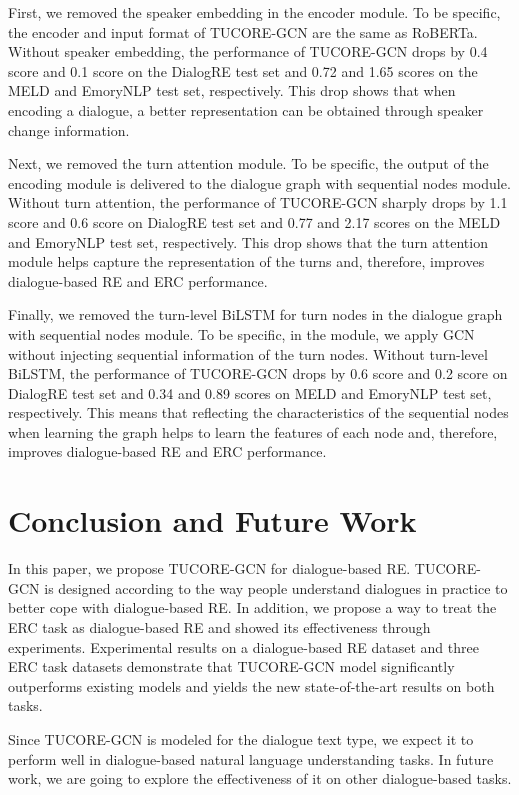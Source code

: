 \documentclass[11pt]{article}
\begin{document}
First, we removed the speaker embedding in the encoder module. To be specific, the encoder and input format of TUCORE-GCN are the same as RoBERTa. Without speaker embedding, the performance of TUCORE-GCN drops by 0.4  score and 0.1  score on the DialogRE test set and 0.72 and 1.65  scores on the MELD and EmoryNLP test set, respectively. This drop shows that when encoding a dialogue, a better representation can be obtained through speaker change information.

Next, we removed the turn attention module. To be specific, the output of the encoding module is delivered to the dialogue graph with sequential nodes module. Without turn attention, the performance of TUCORE-GCN sharply drops by 1.1  score and 0.6  score on DialogRE test set and 0.77 and 2.17  scores on the MELD and EmoryNLP test set, respectively. This drop shows that the turn attention module helps capture the representation of the turns and, therefore, improves dialogue-based RE and ERC performance.

Finally, we removed the turn-level BiLSTM for turn nodes in the dialogue graph with sequential nodes module. To be specific, in the module, we apply GCN without injecting sequential information of the turn nodes. Without turn-level BiLSTM, the performance of TUCORE-GCN drops by 0.6  score and 0.2  score on DialogRE test set and 0.34 and 0.89  scores on MELD and EmoryNLP test set, respectively. This means that reflecting the characteristics of the sequential nodes when learning the graph helps to learn the features of each node and, therefore, improves dialogue-based RE and ERC performance.

\section{Conclusion and Future Work}
In this paper, we propose TUCORE-GCN for dialogue-based RE. TUCORE-GCN is designed according to the way people understand dialogues in practice to better cope with dialogue-based RE. In addition, we propose a way to treat the ERC task as dialogue-based RE and showed its effectiveness through experiments. Experimental results on a dialogue-based RE dataset and three ERC task datasets demonstrate that TUCORE-GCN model significantly outperforms existing models and yields the new state-of-the-art results on both tasks.

Since TUCORE-GCN is modeled for the dialogue text type, we expect it to perform well in dialogue-based natural language understanding tasks. In future work, we are going to explore the effectiveness of it on other dialogue-based tasks.
\end{document}
